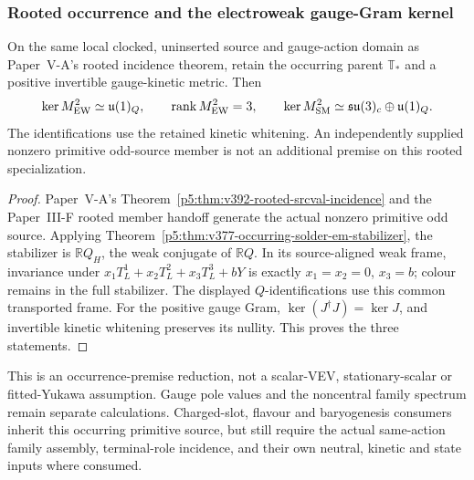 \documentclass[12pt,a4paper]{article}
\begin{document}
\subsubsection{Rooted occurrence and the electroweak gauge-Gram kernel}
\label{p7v2:sec:v2109-rooted-source-transport}
\begin{corollary}
\label{p7v2:cor:v2109-rooted-ew-occurrence}
On the same local clocked, uninserted source and gauge-action domain as
Paper~V-A's rooted incidence theorem, retain the occurring parent
\(\mathbb T_*\) and a positive invertible gauge-kinetic metric.  Then
\[
 \ker M_{\rm EW}^2\simeq\mathfrak u(1)_Q,
 \qquad\operatorname{rank}M_{\rm EW}^2=3,
 \qquad
 \ker M_{\rm SM}^2\simeq\mathfrak{su}(3)_c\oplus\mathfrak u(1)_Q.
\]
The identifications use the retained kinetic whitening.  An independently
supplied nonzero primitive odd-source member is not an additional premise
on this rooted specialization.
\end{corollary}
\begin{proof}
Paper~V-A's Theorem~\ref{p5:thm:v392-rooted-srcval-incidence} and the
Paper~III-F rooted member handoff generate the actual nonzero primitive odd
source.  Applying Theorem~\ref{p5:thm:v377-occurring-solder-em-stabilizer},
the stabilizer is \(\mathbb R Q_H\), the weak conjugate of
\(\mathbb R Q\).  In its source-aligned weak frame, invariance under
\(x_1T_L^1+x_2T_L^2+x_3T_L^3+bY\) is exactly
\(x_1=x_2=0\), \(x_3=b\); colour remains in the full stabilizer.
The displayed \(Q\)-identifications use this common transported frame.
For the positive gauge Gram, \(\ker(J^\dagger J)=\ker J\), and invertible
kinetic whitening preserves its nullity.  This proves the three statements.
\end{proof}
This is an occurrence-premise reduction, not a scalar-VEV, stationary-scalar
or fitted-Yukawa assumption.  Gauge pole values and the noncentral family
spectrum remain separate calculations.  Charged-slot, flavour and
baryogenesis consumers inherit this occurring primitive source, but still
require the actual same-action family assembly, terminal-role incidence,
and their own neutral, kinetic and state inputs where consumed.

\end{document}
